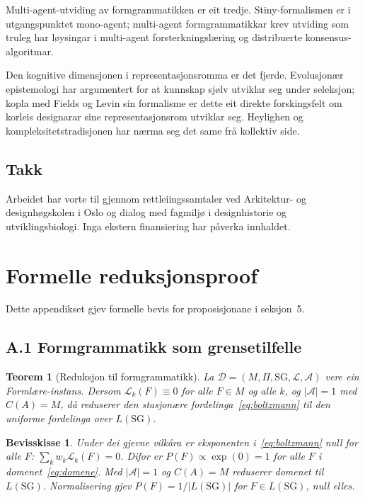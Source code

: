\documentclass[10pt,a4paper,twocolumn]{article}
\newtheorem{theorem}{Teorem}
\newtheorem*{proof*}{Bevisskisse}
\begin{document}
Multi-agent-utviding av formgrammatikken er eit tredje. Stiny-formalismen \citep{stiny2006} er i utgangspunktet mono-agent; multi-agent formgrammatikkar krev utviding som truleg har løysingar i multi-agent forsterkningslæring og distribuerte konsensus-algoritmar.

Den kognitive dimensjonen i representasjonsromma er det fjerde. Evolusjonær epistemologi \citep{campbell1974, popper1972} har argumentert for at kunnskap sjølv utviklar seg under seleksjon; kopla med Fields og Levin sin formalisme er dette eit direkte forskingsfelt om korleis designarar sine representasjonsrom utviklar seg. Heylighen \citeyearpar{heylighen2007} og kompleksitetstradisjonen har nærma seg det same frå kollektiv side.

\subsection*{Takk}
Arbeidet har vorte til gjennom rettleiingssamtaler ved Arkitektur- og designhøgskolen i Oslo og dialog med fagmiljø i designhistorie og utviklingsbiologi. Inga ekstern finansiering har påverka innhaldet.


\appendix
\section{Formelle reduksjonsproof}

Dette appendikset gjev formelle bevis for proposisjonane i seksjon~5.

\subsection*{A.1 Formgrammatikk som grensetilfelle}

\begin{theorem}[Reduksjon til formgrammatikk]
La $\mathcal{D} = (M, \Pi, \mathrm{SG}, \mathcal{L}, \mathcal{A})$ vere ein Formlære-instans. Dersom $\mathcal{L}_k(F) \equiv 0$ for alle $F \in M$ og alle $k$, og $|\mathcal{A}| = 1$ med $C(A) = M$, då reduserer den stasjonære fordelinga~\ref{eq:boltzmann} til den uniforme fordelinga over $L(\mathrm{SG})$.
\end{theorem}

\begin{proof*}
Under dei gjevne vilkåra er eksponenten i~\ref{eq:boltzmann} null for alle $F$: $\sum_k w_k \mathcal{L}_k(F) = 0$. Difor er $P(F) \propto \exp(0) = 1$ for alle $F$ i domenet~\ref{eq:domene}. Med $|\mathcal{A}| = 1$ og $C(A) = M$ reduserer domenet til $L(\mathrm{SG})$. Normalisering gjev $P(F) = 1/|L(\mathrm{SG})|$ for $F \in L(\mathrm{SG})$, null elles.
\end{proof*}
\end{document}
